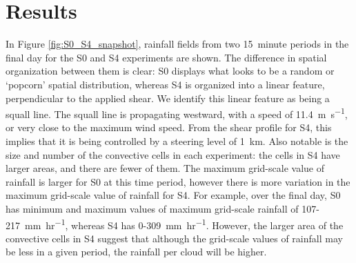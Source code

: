 \documentclass[11pt,a4paper]{article}
\begin{document}
\section{Results}

%

%
In Figure \ref{fig:S0_S4_snapshot}, rainfall fields from two \SI{15}{minute} periods in the final day for the S0 and S4 experiments are shown. The difference in spatial organization between them is clear: S0 displays what looks to be a random or `popcorn' spatial distribution, whereas S4 is organized into a linear feature, perpendicular to the applied shear. We identify this linear feature as being a squall line. The squall line is propagating westward, with a speed of \SI{11.4}{m.s^{-1}}, or very close to the maximum wind speed. From the shear profile for S4, this implies that it is being controlled by a steering level of \SI{1}{km}. Also notable is the size and number of the convective cells in each experiment: the cells in S4 have larger areas, and there are fewer of them. The maximum grid-scale value of rainfall is larger for S0 at this time period, however there is more variation in the maximum grid-scale value of rainfall for S4. For example, over the final day, S0 has minimum and maximum values of maximum grid-scale rainfall of \SI{107}{}-\SI{217}{mm.hr^{-1}}, whereas S4 has \SI{0}{}-\SI{309}{mm.hr^{-1}}. However, the larger area of the convective cells in S4 suggest that although the grid-scale values of rainfall may be less in a given period, the rainfall per cloud will be higher.
\end{document}
